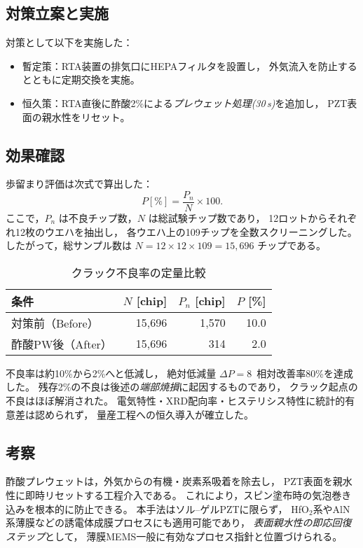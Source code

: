 \documentclass[conference]{IEEEtran}
\begin{document}
\subsection{対策立案と実施}
対策として以下を実施した：
\begin{itemize}
  \item 暫定策：RTA装置の排気口にHEPAフィルタを設置し，
        外気流入を防止するとともに定期交換を実施。
  \item 恒久策：RTA直後に酢酸2\%による\emph{プレウェット処理(30\,s)}を追加し，
        PZT表面の親水性をリセット。
\end{itemize}

\subsection{効果確認}
歩留まり評価は次式で算出した：
\[
  P[\%] = \frac{P_n}{N} \times 100.
\]
ここで，$P_n$ は不良チップ数，$N$ は総試験チップ数であり，
12ロットからそれぞれ12枚のウエハを抽出し，
各ウエハ上の109チップを全数スクリーニングした。
したがって，総サンプル数は
$N = 12 \times 12 \times 109 = 15{,}696$ チップである。

\begin{table}[h]
  \centering
  \caption{クラック不良率の定量比較}
  \label{tab:crack-yield}
  \setlength{\tabcolsep}{4pt}
  \begin{tabular}{@{}lrrr@{}}
    \toprule
    条件 & $N$ [chip] & $P_n$ [chip] & $P$ [\%] \\
    \midrule
    対策前（Before） & 15{,}696 & 1{,}570 & 10.0 \\
    酢酸PW後（After） & 15{,}696 & 314 & 2.0 \\
    \bottomrule
  \end{tabular}
\end{table}

不良率は約10\%から2\%へと低減し，
絶対低減量 $\Delta P=8$\,%
相対改善率80\%を達成した。
残存2\%の不良は後述の\emph{端部焼損}に起因するものであり，
クラック起点の不良はほぼ解消された。
電気特性・XRD配向率・ヒステリシス特性に統計的有意差は認められず，
量産工程への恒久導入が確立した。

\subsection{考察}
酢酸プレウェットは，外気からの有機・炭素系吸着を除去し，
PZT表面を親水性に即時リセットする工程介入である。
これにより，スピン塗布時の気泡巻き込みを根本的に防止できる。
本手法はソル–ゲルPZTに限らず，
HfO$_2$系やAlN系薄膜などの誘電体成膜プロセスにも適用可能であり，
\emph{表面親水性の即応回復ステップ}として，
薄膜MEMS一般に有効なプロセス指針と位置づけられる。
\end{document}
